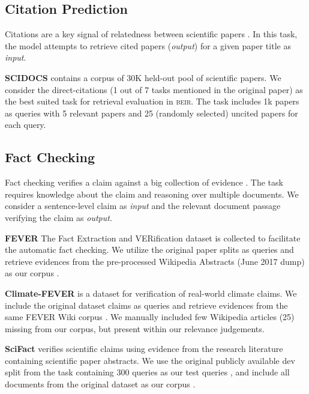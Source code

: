 \documentclass{article}
\newcommand{\custo}[1]{\textsc{\normalsize #1}}
\newcommand{\beir}{\custo{beir}\xspace}
\begin{document}
\vspace{-2mm}
\subsection{Citation Prediction}
\vspace{-1mm}
Citations are a key signal of relatedness between scientific papers \cite{cohan-etal-2020-specter}. In this task, the model attempts to retrieve cited papers (\textit{output}) for a given paper title as \textit{input}.

\textbf{SCIDOCS} \cite{cohan-etal-2020-specter} contains a corpus  of 30K held-out pool of scientific papers. We consider the direct-citations (1 out of 7 tasks mentioned in the original paper) as the best suited task for retrieval evaluation in \beir. The task includes 1k papers as queries  with 5 relevant papers and 25 (randomly selected) uncited papers for each query. 

\vspace{-1mm}
\subsection{Fact Checking}
\vspace{-1mm}
Fact checking verifies a claim against a big collection of evidence \cite{thorne-etal-2018-fever}. The task requires knowledge about the claim and reasoning over multiple documents. We consider a sentence-level claim as \textit{input} and the relevant document passage verifying the claim as \textit{output}.

\textbf{FEVER} \cite{thorne-etal-2018-fever} The Fact Extraction and VERification dataset is collected to facilitate the automatic fact checking. We utilize the original paper splits as queries  and retrieve evidences from the pre-processed Wikipedia Abstracts (June 2017 dump) as our corpus .

\textbf{Climate-FEVER} \cite{diggelmann2020climatefever} is a dataset for verification of real-world climate claims. We include the original dataset claims as queries  and retrieve evidences from the same FEVER Wiki corpus . We manually included few Wikipedia articles (25) missing from our corpus, but present within our relevance judgements.

\textbf{SciFact} \cite{wadden-etal-2020-fact} verifies scientific claims using evidence from the research literature containing scientific paper abstracts. We use the original publicly available dev split from the task containing 300 queries as our test queries , and include all documents from the original dataset as our corpus .
\end{document}
